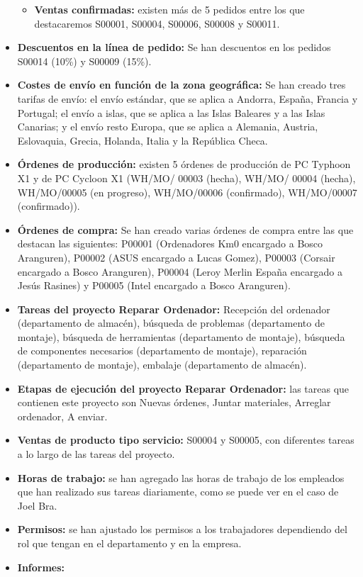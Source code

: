 \begin{itemize}
\begin{itemize}
\begin{itemize}
        \end{itemize}
        \item \textbf{Ventas confirmadas:} existen más de 5 pedidos entre los que destacaremos S00001, S00004, S00006, S00008 y S00011.
    \end{itemize}
    \item \textbf{Descuentos en la línea de pedido:} Se han descuentos en los pedidos S00014 (10\%) y S00009 (15\%).
    \item \textbf{Costes de envío en función de la zona geográfica:} Se han creado tres tarifas de envío: el envío estándar, que se aplica a Andorra, España, Francia y Portugal; el envío a islas, que se aplica a las Islas Baleares y a las Islas Canarias; y el envío resto Europa, que se aplica a Alemania, Austria, Eslovaquia, Grecia, Holanda, Italia y la República Checa.
    \item \textbf{Órdenes de producción:} existen 5 órdenes de producción de PC Typhoon X1 y de PC Cycloon X1 (WH/MO/ 00003 (hecha), WH/MO/ 00004 (hecha), WH/MO/00005 (en progreso), WH/MO/00006 (confirmado), WH/MO/00007 (confirmado)).
    \item \textbf{Órdenes de compra:} Se han creado varias órdenes de compra entre las que destacan las siguientes: P00001 (Ordenadores Km0 encargado a Bosco Aranguren), P00002 (ASUS encargado a Lucas Gomez), P00003 (Corsair encargado a Bosco Aranguren), P00004 (Leroy Merlin España encargado a Jesús Rasines) y P00005 (Intel encargado a Bosco Aranguren).
    \item \textbf{Tareas del proyecto Reparar Ordenador:} Recepción del ordenador (departamento de almacén), búsqueda de problemas (departamento de montaje), búsqueda de herramientas (departamento de montaje), búsqueda de componentes necesarios (departamento de montaje), reparación (departamento de montaje), embalaje (departamento de almacén).
    \item \textbf{Etapas de ejecución del proyecto Reparar Ordenador:} las tareas que contienen este proyecto son Nuevas órdenes, Juntar materiales, Arreglar ordenador, A enviar.
    \item \textbf{Ventas de producto tipo servicio:} S00004 y S00005, con diferentes tareas a lo largo de las tareas del proyecto.
    \item \textbf{Horas de trabajo:} se han agregado las horas de trabajo de los empleados que han realizado sus tareas diariamente, como se puede ver en el caso de Joel Bra.
    \item \textbf{Permisos:} se han ajustado los permisos a los trabajadores dependiendo del rol que tengan en el departamento y en la empresa.
    \item \textbf{Informes:}
    \end{itemize}

